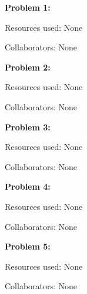 \documentclass[11pt,largemargins]{homework}
\begin{document}
\maketitle

\newpage
\setcounter{questionCounter}{-1}
\question
\textbf{Problem 1:} 

Resources used: None

Collaborators: None

\textbf{Problem 2:} 

Resources used: None

Collaborators: None

\textbf{Problem 3:} 

Resources used: None

Collaborators: None

\textbf{Problem 4:} 

Resources used: None

Collaborators: None

\textbf{Problem 5:} 

Resources used: None

Collaborators: None

\newpage
\question
\end{document}

